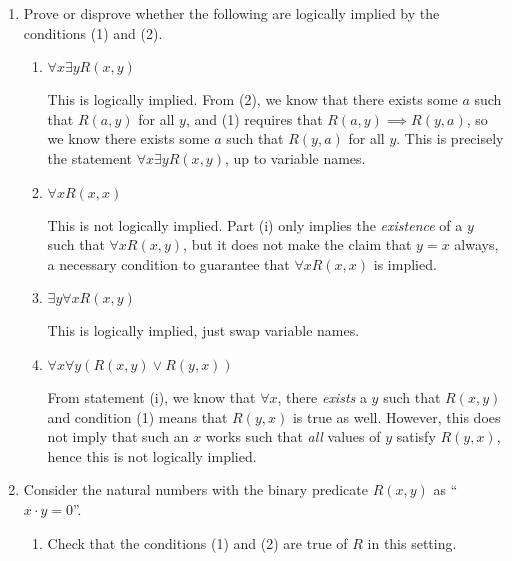 \documentclass[10pt]{article}
\begin{document}
	\begin{enumerate}[label=\alph*)]
		\item Prove or disprove whether the following are logically implied by the 
			conditions (1) and (2).
			\begin{enumerate}[label=\roman*)]
				\item \( \forall x \exists y R(x, y) \)

					\begin{solution}
						This is logically implied. From (2), we know that there 
						exists some \( a \) such that \( R(a, y) \) for all \( y \), 
						and (1) requires that \( R(a, y) \implies R(y, a) \), so 
						we know there exists some \( a \) such that \( R(y, a) \) 
						for all \( y \). This is precisely the statement 
						\( \forall x \exists y R(x, y) \), up to variable names. 
					\end{solution}
				\item \( \forall x R(x, x) \) 

					\begin{solution}
						This is not logically implied. Part (i) only implies the 
						\textit{existence} of a \( y \) such that 
						\( \forall x R(x, y)\), but it does not make the claim that 
						\( y = x \) always, a necessary condition to guarantee
						 that \( \forall x R(x, x) \) is implied. 
					\end{solution}
				\item \( \exists y \forall x R(x, y) \)

					\begin{solution}
						This is logically implied, just swap variable 
						names. 
					\end{solution}
				\item \( \forall x \forall y \left( R(x, y) \lor R(y, x) \right)  \)

					\begin{solution}
						From statement (i), we know that \( \forall x \), 
						there \textit{exists} a \( y \) such that \( R(x, y) \) 
						and condition (1) means that \( R(y, x) \) is true as well. 
						However, this does not imply that such an \( x \) works 
						such that \textit{all} values of \( y \) satisfy 
						\( R(y, x) \), hence this is not logically implied. 
					\end{solution}
			\end{enumerate}
		\item Consider the natural numbers with the binary predicate 
			\( R(x, y) \) as ``\( x \cdot y = 0 \)''. 
			\begin{enumerate}[label=\roman*)]
				\item Check that the conditions (1) and (2) are true of \( R \) 
					in this setting. 


\end{enumerate}
\end{enumerate}
\end{document}
